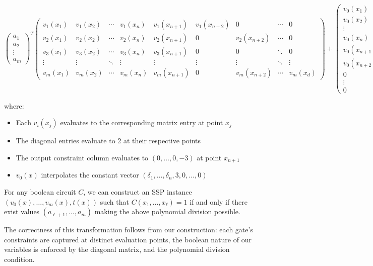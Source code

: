 \[ \begin{pmatrix} 
a_1 \\ 
a_2 \\ 
\vdots \\ 
a_m 
\end{pmatrix}^T
\begin{pmatrix}
v_1(x_1) & v_1(x_2) & \cdots & v_1(x_n) & v_1(x_{n+1}) & v_1(x_{n+2}) & 0 & \cdots & 0 \\
v_2(x_1) & v_2(x_2) & \cdots & v_2(x_n) & v_2(x_{n+1}) & 0 & v_2(x_{n+2}) & \cdots & 0 \\
v_3(x_1) & v_3(x_2) & \cdots & v_3(x_n) & v_3(x_{n+1}) & 0 & 0 & \ddots & 0 \\
\vdots & \vdots & \ddots & \vdots & \vdots & \vdots & \vdots & \ddots & \vdots \\
v_m(x_1) & v_m(x_2) & \cdots & v_m(x_n) & v_m(x_{n+1}) & 0 & v_m(x_{n+2}) & \cdots & v_m(x_d)
\end{pmatrix} + 
\begin{pmatrix} v_0(x_1) \\ v_0(x_2) \\ \vdots \\ v_0(x_n) \\ v_0(x_{n+1}) \\ v_0(x_{n+2}) \\ 0 \\ \vdots \\ 0 \end{pmatrix}^T \]

where:
\begin{itemize}
    \item Each $v_i(x_j)$ evaluates to the corresponding matrix entry at point $x_j$
    \item The diagonal entries evaluate to 2 at their respective points
    \item The output constraint column evaluates to $(0,\ldots,0,-3)$ at point $x_{n+1}$
    \item $v_0(x)$ interpolates the constant vector $(\delta_1,\ldots,\delta_n,3,0,\ldots,0)$
\end{itemize}

For any boolean circuit $C$, we can construct an SSP instance $(v_0(x),\ldots,v_m(x),t(x))$ such that $C(x_1,\ldots,x_\ell) = 1$ if and only if there exist values $(a_{\ell+1},\ldots,a_m)$ making the above polynomial division possible.

The correctness of this transformation follows from our construction: each gate's constraints are captured at distinct evaluation points, the boolean nature of our variables is enforced by the diagonal matrix, and the polynomial division condition.




